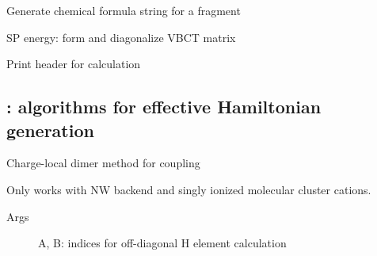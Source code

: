 \documentclass[letterpaper,10pt,english]{sphinxmanual}
\begin{document}

\begin{fulllineitems}
\label{\detokenize{vbct:vbct.energy.fraglabel}}
Generate chemical formula string for a fragment

\end{fulllineitems}


\begin{fulllineitems}
\label{\detokenize{vbct:vbct.energy.kernel}}
SP energy: form and diagonalize VBCT matrix

\end{fulllineitems}


\begin{fulllineitems}
\label{\detokenize{vbct:vbct.energy.print_vbct_init}}
Print header for calculation

\end{fulllineitems}



\subsection{: algorithms for effective Hamiltonian generation}
\label{\detokenize{vbct:module-vbct.vbct_calc}}\label{\detokenize{vbct:vbct-calc-algorithms-for-effective-hamiltonian-generation}}

\begin{fulllineitems}
\label{\detokenize{vbct:vbct.vbct_calc.coupl_chglocal}}
Charge-local dimer method for coupling

Only works with NW backend and singly ionized molecular cluster cations.
\begin{description}
\item[{Args}] \leavevmode
A, B: indices for off-diagonal H element calculation

\end{description}

\end{fulllineitems}
\end{document}
